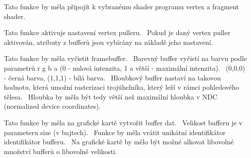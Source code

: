 
\begin{DoxyRefList}
\item[\label{todo__todo000019}%
\Hypertarget{todo__todo000019}%
Global \hyperlink{group__program__tasks_gafe72b55028369d1e9e9f8d087c76af09}{G\+PU\+:\+:attach\+Shaders} (Program\+ID prg, Vertex\+Shader vs, Fragment\+Shader fs)]Tato funkce by měla připojít k vybranému shader programu vertex a fragment shader.  
\item[\label{todo__todo000014}%
\Hypertarget{todo__todo000014}%
Global \hyperlink{group__vertexpuller__tasks_gac7f9799e1a6a3b1cafb5f4c4c5e9555d}{G\+PU\+:\+:bind\+Vertex\+Puller} (Vertex\+Puller\+ID vao)]Tato funkce aktivuje nastavení vertex pulleru.~\newline
 Pokud je daný vertex puller aktivován, atributy z bufferů jsou vybírány na základě jeho nastavení.~\newline
  
\item[\label{todo__todo000035}%
\Hypertarget{todo__todo000035}%
Global \hyperlink{group__draw__tasks_ga012ff10197fb3e5051b854a0028db31d}{G\+PU\+:\+:clear} (float r, float g, float b, float a)]Tato funkce by měla vyčistit framebuffer.~\newline
 Barevný buffer vyčistí na barvu podle parametrů r g b a (0 -\/ nulová intenzita, 1 a větší -\/ maximální intenzita).~\newline
 (0,0,0) -\/ černá barva, (1,1,1) -\/ bílá barva.~\newline
 Hloubkový buffer nastaví na takovou hodnotu, která umožní rasterizaci trojúhelníka, který leží v rámci pohledového tělesa.~\newline
 Hloubka by měla být tedy větší než maximální hloubka v N\+DC (normalized device coordinates).~\newline
  
\item[\label{todo__todo000003}%
\Hypertarget{todo__todo000003}%
Global \hyperlink{group__buffer__tasks_ga309724692e0d90a686642379f12d8d44}{G\+PU\+:\+:create\+Buffer} (uint64\+\_\+t size)]Tato funkce by měla na grafické kartě vytvořit buffer dat.~\newline
 Velikost bufferu je v parameteru size (v bajtech).~\newline
 Funkce by měla vrátit unikátní identifikátor identifikátor bufferu.~\newline
 Na grafické kartě by mělo být možné alkovat libovolné množství bufferů o libovolné velikosti.~\newline
  

\end{DoxyRefList}
